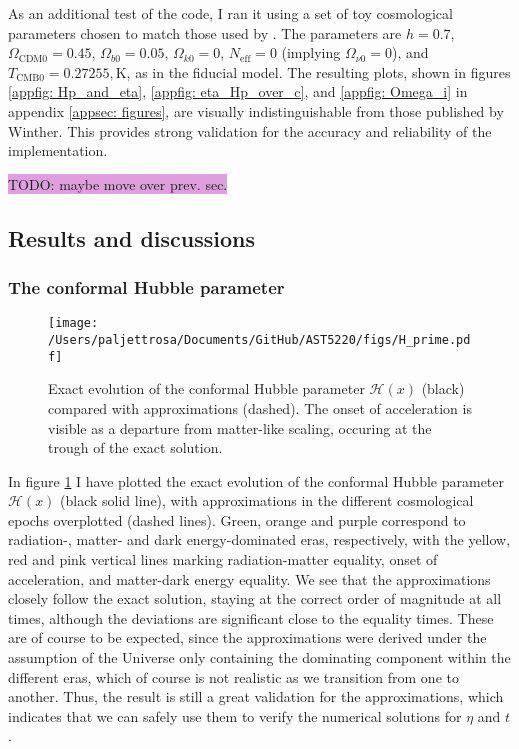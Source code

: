 \documentclass{aa}
\numberwithin{equation}{section}
\numberwithin{table}{section}
\numberwithin{figure}{section}
\begin{document}
As an additional test of the code, I ran it using a set of toy cosmological parameters chosen to match those used by \cite{Course}. The parameters are $h = 0.7$, $\Omega_\text{CDM0} = 0.45$, $\Omega_{b0} = 0.05$, $\Omega_{k0} = 0$, $N_\text{eff} = 0$ (implying $\Omega_{\nu0} = 0$), and $T_\text{CMB0} = 0.27255,\text{K}$, as in the fiducial model. The resulting plots, shown in figures \ref{appfig: Hp_and_eta}, \ref{appfig: eta_Hp_over_c}, and \ref{appfig: Omega_i} in appendix \ref{appsec: figures}, are visually indistinguishable from those published by Winther. This provides strong validation for the accuracy and reliability of the implementation.

\colorbox{Plum}{TODO: maybe move over prev. sec.}


\subsection{Results and discussions}\label{subsec: I results}

\subsubsection{The conformal Hubble parameter}
\begin{figure}
  \centering
  \texttt{[image: /Users/paljettrosa/Documents/GitHub/AST5220/figs/H\_prime.pdf]}
  \caption{Exact evolution of the conformal Hubble parameter $\mathcal{H}(x)$ (black) compared with approximations (dashed). The onset of acceleration is visible as a departure from matter-like scaling, occuring at the trough of the exact solution.}\label{fig:H_prime}
\end{figure}


In figure \ref{fig:H_prime} I have plotted the exact evolution of the conformal Hubble parameter $\mathcal{H}(x)$ (black solid line), with approximations in the different cosmological epochs overplotted (dashed lines). Green, orange and purple correspond to radiation-, matter- and dark energy-dominated eras, respectively, with the yellow, red and pink vertical lines marking radiation-matter equality, onset of acceleration, and matter-dark energy equality. We see that the approximations closely follow the exact solution, staying at the correct order of magnitude at all times, although the deviations are significant close to the equality times. These are of course to be expected, since the approximations were derived under the assumption of the Universe only containing the dominating component within the different eras, which of course is not realistic as we transition from one to another. Thus, the result is still a great validation for the approximations, which indicates that we can safely use them to verify the numerical solutions for $\eta$ and $t$.
\end{document}
